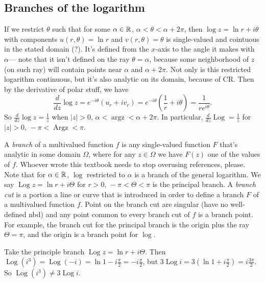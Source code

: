 \subsection{Branches of the logarithm}
If we restrict $\theta$ such that for some $\alpha \in \mathbb{R}$, $\alpha <\theta<\alpha +2\pi$, then $\log z=\ln r+i\theta$ with components $u(r,\theta)=\ln r$ and $v(r,\theta)=\theta$ is single-valued and cointuous in the stated domain (?). It's defined from the $x$-axis to the angle it makes with $\alpha $— note that it isn't defined on the ray $\theta=\alpha $, because some neighborhood of $z$ (on such ray) will contain points near $\alpha $ and $\alpha +2\pi$. Not only is this restricted logarithm continuous, but it's also analytic on its domain, because of CR. Then by the derivative of polar stuff, we have \[
    \frac{d}{dz}\log z =e^{-i\theta}(u_r+iv_r)=e^{-i\theta}\left( \frac{1}{r}+i\theta \right) =\frac{1}{re^{i\theta}}.
\] So $\frac{d}{dz}\log z=\frac{1}{z}$ when $|z|>0,\,\alpha <\operatorname{arg z}<\alpha +2\pi$. In particular, $\frac{d}{dz}\operatorname{Log}=\frac{1}{z}$ for $|z|>0,\,-\pi<\operatorname{Arg z}<\pi$.

A \emph{branch} of a multivalued function $f$ is any single-valued function $F$ that's analytic in some domain $\Omega$, where for any $z\in \Omega$ we have $F(z)$ one of the values of $f$. Whoever wrote this textbook needs to stop overusing references, please. Note that for $\alpha \in \mathbb{R}$, $\log$ restricted to $\alpha $ is a branch of the general logarithm. We say $\operatorname{Log}z = \ln r+i\Theta$ for $r>0,\,-\pi<\Theta<\pi$ is the principal branch. A \emph{branch cut} is a portion a line or curve that is introduced in order to define a branch $F$ of a multivalued function $f$. Point on the branch cut are singular (have no well-defined nbd) and any point common to every branch cut of $f$ is a branch point. For example, the branch cut for the principal branch is the origin plus the ray $\Theta=\pi$, and the origin is a branch point for $\log$.

\begin{example}
    Take the principle branch $\operatorname{Log}z=\ln r+i\Theta$. Then $\operatorname{Log}(i^3)=\operatorname{Log}(-i)=\ln 1-i \frac{\pi}{2}=-i \frac{\pi}{2}$, but $3 \operatorname{Log}i=3\left( \ln 1+ i\frac{\pi}{2} \right) =i\frac{3\pi}{2}$. So $\operatorname{Log}(i^3)\neq 3\operatorname{Log}i$.    
\end{example}

